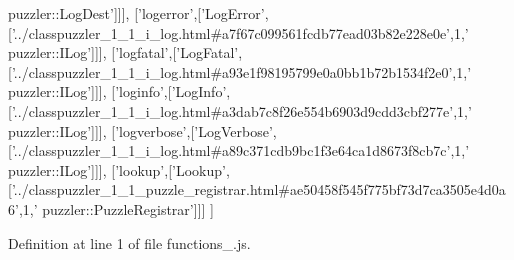 \begin{DoxyCode}
{      puzzler::LogDest'}]]],
  [\textcolor{stringliteral}{'logerror'},[\textcolor{stringliteral}{'LogError'},[\textcolor{stringliteral}{'../classpuzzler\_1\_1\_i\_log.html#a7f67c099561fcdb77ead03b82e228e0e'},1,\textcolor{stringliteral}{'
      puzzler::ILog'}]]],
  [\textcolor{stringliteral}{'logfatal'},[\textcolor{stringliteral}{'LogFatal'},[\textcolor{stringliteral}{'../classpuzzler\_1\_1\_i\_log.html#a93e1f98195799e0a0bb1b72b1534f2e0'},1,\textcolor{stringliteral}{'
      puzzler::ILog'}]]],
  [\textcolor{stringliteral}{'loginfo'},[\textcolor{stringliteral}{'LogInfo'},[\textcolor{stringliteral}{'../classpuzzler\_1\_1\_i\_log.html#a3dab7c8f26e554b6903d9cdd3cbf277e'},1,\textcolor{stringliteral}{'
      puzzler::ILog'}]]],
  [\textcolor{stringliteral}{'logverbose'},[\textcolor{stringliteral}{'LogVerbose'},[\textcolor{stringliteral}{'../classpuzzler\_1\_1\_i\_log.html#a89c371cdb9bc1f3e64ca1d8673f8cb7c'},1,\textcolor{stringliteral}{'
      puzzler::ILog'}]]],
  [\textcolor{stringliteral}{'lookup'},[\textcolor{stringliteral}{'Lookup'},[\textcolor{stringliteral}{'../classpuzzler\_1\_1\_puzzle\_registrar.html#ae50458f545f775bf73d7ca3505e4d0a6'},1,\textcolor{stringliteral}{'
      puzzler::PuzzleRegistrar'}]]]
]
\end{DoxyCode}


Definition at line 1 of file functions\+\_.\+js.

